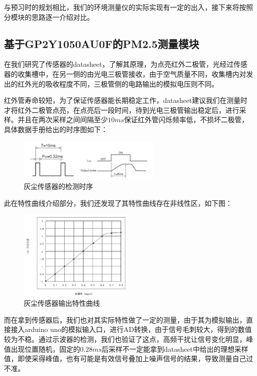 \documentclass[a4paper, 11pt]{article} %
\begin{document}
与预习时的规划相比，我们的环境测量仪的实际实现有一定的出入，接下来将按照分模块的思路逐一介绍对比。

\subsection{基于GP2Y1050AU0F的PM2.5测量模块}

在我们研究了传感器的datasheet，了解其原理，为点亮红外二极管，光经过传感器的收集槽中，在另一侧的由光电三极管接收，由于空气质量不同，收集槽内对发出的红外光的吸收程度不同，三极管侧的电路输出的模拟电压则不同。

红外管寿命较短，为了保证传感器能长期稳定工作，datasheet建议我们在测量时才将红外二极管点亮，在点亮后一段时间，待到光电三极管输出稳定后，进行采样。并且在两次采样之间间隔至少$10ms$保证红外管闪烁频率低，不损坏二极管，具体数据手册给出的时序图如下：

\begin{figure}[H]
  \centering
  \includegraphics[width = 0.618\textwidth]{GP2Ysetup.png}
  \caption{灰尘传感器的检测时序}
\end{figure}

此在特性曲线介绍部分，我们还发现了其特性曲线存在非线性区，如下图：

\begin{figure}[H]
  \centering
  \includegraphics[width = 0.5\textwidth]{GP2Y_character.png}
  \caption{灰尘传感器输出特性曲线}
\end{figure}

而在拿到传感器后，我们也对其实际特性做了一定的测量，由于其为模拟输出，直接接入arduino uno的模拟输入口，进行AD转换，由于信号毛刺较大，得到的数值较为不稳。通过示波器的检测，我们也验证了这点，高频干扰让信号变化明显，峰值出现位置随机，固定的$0.28ms$后采样不一定能拿到datasheet中给出的理想采样值，即使采得峰值，也有可能是有效信号叠加上噪声信号的结果，导致测量自己过不准。
\end{document}
